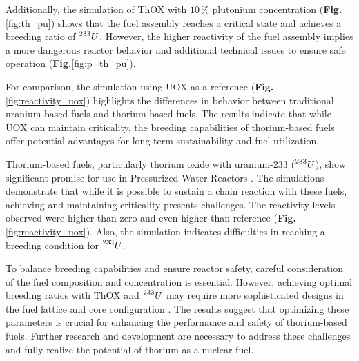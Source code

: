 Additionally, the simulation of ThOX with \(10 \, \%\) plutonium concentration (\textbf{Fig.}\ref{fig:th_pu}) shows that the fuel assembly reaches a critical state and achieves a breeding ratio of \(\prescript{233}{}{U}\). However, the higher reactivity of the fuel assembly implies a more dangerous reactor behavior and additional technical issues to ensure safe operation (\textbf{Fig.}\ref{fig:p_th_pu}).

For comparison, the simulation using UOX as a reference (\textbf{Fig.}\ref{fig:reactivity_uox}) highlights the differences in behavior between traditional uranium-based fuels and thorium-based fuels. The results indicate that while UOX can maintain criticality, the breeding capabilities of thorium-based fuels offer potential advantages for long-term sustainability and fuel utilization.

Thorium-based fuels, particularly thorium oxide with uranium-233 (\(\prescript{233}{}{U}\)), show significant promise for use in Pressurized Water Reactors . The simulations demonstrate that while it is possible to sustain a chain reaction with these fuels, achieving and maintaining criticality presents challenges. The reactivity levels observed were higher than zero and even higher than reference (\textbf{Fig.}\ref{fig:reactivity_uox}). Also, the simulation indicates difficulties in reaching a breeding condition for \(\prescript{233}{}{U}\).

\vspace{90pt}

To balance breeding capabilities and ensure reactor safety, careful consideration of the fuel composition and concentration is essential. However, achieving optimal breeding ratios with ThOX and \(\prescript{233}{}{U}\) may require more sophisticated designs in the fuel lattice and core configuration \cite{roadmap}. The results suggest that optimizing these parameters is crucial for enhancing the performance and safety of thorium-based fuels. Further research and development are necessary to address these challenges and fully realize the potential of thorium as a nuclear fuel.